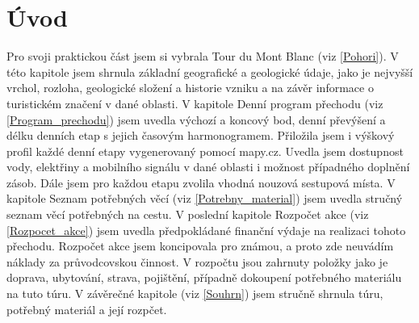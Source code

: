 \chapter*{Úvod}
\label{Uvod}
\def\figurename{Obr.} %
\def\tablename{Tab.} %
\def\figureautorefname{obr.} %
\def\tableautorefname{tab.} %
\def\chapterautorefname{kapitola} %
Pro svoji praktickou část jsem si vybrala Tour du Mont Blanc (viz \autoref{Pohori}). V této kapitole jsem shrnula základní geografické a geologické údaje, jako je nejvyšší vrchol, rozloha, geologické složení a historie vzniku a na závěr informace o turistickém značení v dané oblasti. V kapitole Denní program přechodu (viz \autoref{Program_prechodu}) jsem uvedla výchozí a koncový bod, denní převýšení a délku denních etap s jejich časovým harmonogramem. Přiložila jsem i výškový profil každé denní etapy vygenerovaný pomocí mapy.cz. Uvedla jsem dostupnost vody, elektřiny a mobilního signálu v dané oblasti i možnost případného doplnění zásob. Dále jsem pro každou etapu zvolila vhodná nouzová sestupová místa. V kapitole Seznam potřebných věcí (viz \autoref{Potrebny_material}) jsem uvedla stručný seznam věcí potřebných na cestu. V poslední kapitole Rozpočet akce (viz \autoref{Rozpocet_akce}) jsem uvedla předpokládané finanční výdaje na realizaci tohoto přechodu. Rozpočet akce jsem koncipovala pro známou, a proto zde neuvádím náklady za průvodcovskou činnost. V rozpočtu jsou zahrnuty položky jako je doprava, ubytování, strava, pojištění, případně dokoupení potřebného materiálu na tuto túru. V závěrečné kapitole (viz \autoref{Souhrn}) jsem stručně shrnula túru, potřebný materiál a její rozpčet.